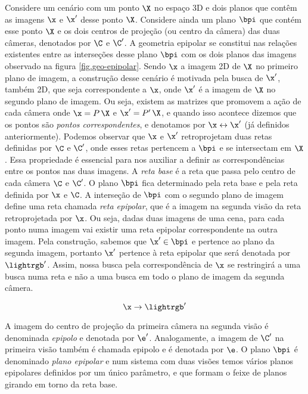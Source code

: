 Considere um cenário com um ponto $\X$ no espaço 3D e dois planos que contêm as imagens $\x$ e $\x'$ desse ponto $\X$. Considere ainda um plano $\bpi$ que contém esse ponto $\X$ e os dois centros de projeção (ou centro da câmera) das duas câmeras, denotados por $\C$ e $\C'$. A geometria epipolar se constitui nas relações existentes entre as interseções desse plano $\bpi$ com os dois planos das imagens observado na figura \ref{fig.geo-epipolar}. Sendo $\x$ a imagem 2D de $\X$ no primeiro plano de imagem, a construção desse cenário é motivada pela busca de $\x'$, também 2D, que seja correspondente a $\x$, onde $\x'$ é a imagem de $\X$ no segundo plano de imagem. Ou seja, existem as matrizes que promovem a ação de cada câmera onde $\x=P\,\X$ e $\x'=P'\,\X$, e quando isso acontece dizemos que os pontos são {\it pontos correspondentes}, e denotamos por $\x\leftrightarrow\x'$ (já definidos anteriormente). Podemos observar que $\x$ e $\x'$ retroprojetam duas retas definidas por $\C$ e $\C'$, onde esses retas pertencem a $\bpi$ e se intersectam em $\X$. Essa propriedade é essencial para nos auxiliar a definir as correspondências entre os pontos nas duas imagens. A \textit{reta base} é a reta que passa pelo centro de cada câmera $\C$ e $\C'$. O plano $\bpi$ fica determinado pela reta base e pela reta definida por $\x$ e $\C$. A interseção de $\bpi$ com o segundo plano de imagem define uma reta chamada \textit{reta epipolar}, que é a imagem na segunda visão da reta retroprojetada por $\x$. Ou seja, dadas duas imagens de uma cena, para cada ponto numa imagem vai existir uma reta epipolar correspondente na outra imagem. Pela construção, sabemos que $\x'\in\bpi$ e pertence ao plano da segunda imagem, portanto $\x'$ pertence à reta epipolar que será denotada por $\lightrgb'$. Assim, nossa busca pela correspondência de $\x$ se restringirá a uma busca numa reta e não a uma busca em todo o plano de imagem da segunda câmera. 

\begin{equation*}
\x\rightarrow\lightrgb'
\end{equation*}

A imagem do centro de projeção da primeira câmera na segunda visão é denominada \textit{epipolo} e denotada por $\e'$. Analogamente, a imagem de $\C'$ na primeira visão também é chamada epipolo e é denotada por $\e$.
O plano $\bpi$ é denominado \textit{plano epipolar} e num sistema com duas visões temos vários planos epipolares definidos por um único parâmetro, e que formam o feixe de planos girando em torno da reta base.

